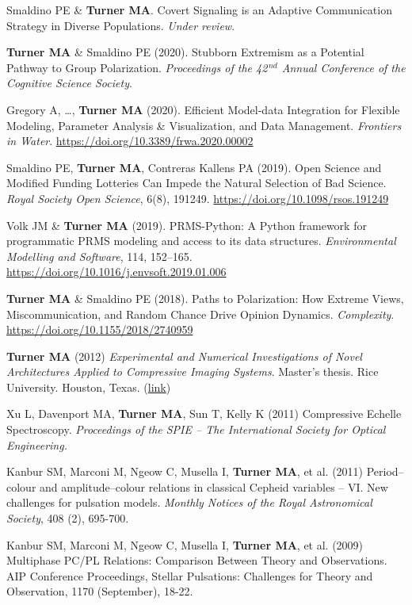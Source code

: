 \documentclass[letterpaper,11pt,oneside]{article}
\begin{document}
\begin{hangparas}{0.25in}{1}
Smaldino PE \& \textbf{Turner MA}. Covert Signaling is an Adaptive Communication Strategy in Diverse Populations. \emph{Under review}.

  \textbf{Turner MA} \& Smaldino PE (2020). Stubborn Extremism as a Potential Pathway to Group Polarization. \emph{Proceedings of the 42$^{\,nd}$ Annual Conference of the Cognitive Science Society}.

    Gregory A, \ldots, \textbf{Turner MA} (2020). Efficient Model-data Integration for Flexible Modeling, Parameter Analysis \& Visualization, and Data Management. \emph{Frontiers in Water}. 
    \url{https://doi.org/10.3389/frwa.2020.00002}

    Smaldino PE, \textbf{Turner MA}, Contreras Kallens PA (2019). Open Science and Modified Funding Lotteries Can Impede the Natural Selection of Bad Science. \emph{Royal Society Open Science}, 6(8), 191249. \url{https://doi.org/10.1098/rsos.191249}

    Volk JM \& \textbf{Turner MA} (2019). PRMS-Python: A Python framework for programmatic PRMS modeling and access to its data structures. \emph{Environmental Modelling and Software}, 114, 152–165. \url{https://doi.org/10.1016/j.envsoft.2019.01.006}

    \textbf{Turner MA} \& Smaldino PE (2018). Paths to Polarization: How Extreme Views,
    Miscommunication, and Random Chance Drive Opinion Dynamics. \emph{Complexity}. \url{https://doi.org/10.1155/2018/2740959}
    
  \textbf{Turner MA} (2012) \emph{Experimental and Numerical Investigations of Novel Architectures Applied to Compressive Imaging Systems}. Master's thesis. Rice University. Houston, Texas. (\href{https://www.researchgate.net/publication/274720620_Experimental_and_Numerical_In vestigations_of_Novel_Architectures_Applied_to_Compressive_Imaging_Systems}{link})

    Xu L, Davenport MA, \textbf{Turner MA}, Sun T, Kelly K (2011) Compressive Echelle Spectroscopy. \emph{Proceedings of the SPIE – The International Society for Optical Engineering.}

    Kanbur SM, Marconi M, Ngeow C, Musella I, \textbf{Turner MA}, et al. (2011) Period–colour and amplitude–colour relations in classical Cepheid variables – VI. New challenges for pulsation models. \emph{Monthly Notices of the Royal Astronomical Society}, 408 (2), 695-700.

    Kanbur SM, Marconi M, Ngeow C, Musella I, \textbf{Turner MA}, et al. (2009) Multiphase PC/PL Relations: Comparison Between Theory and Observations. AIP Conference Proceedings, Stellar Pulsations: Challenges for Theory and Observation, 1170 (September), 18-22.
    
  \end{hangparas}
\end{document}
